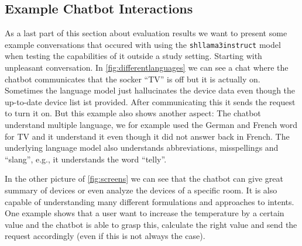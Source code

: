 \subsection{Example Chatbot Interactions}
As a last part of this section about evaluation results we want to present some example conversations that occured with using the \texttt{shllama3instruct} model when testing the capabilities of it outside a study setting.
Starting with unpleasant conversation. In \cref{fig:differentlanguages} we can see a chat where the chatbot communicates that the socker ``TV'' is off but it is actually on. Sometimes the language model just hallucinates the device data even though the up-to-date device list ist provided. After communicating this it sends the request to turn it on. But this example also shows another aspect: The chatbot understand multiple language, we for example used the German and French word for TV and it understand it even though it did not answer back in French.
The underlying language model also understands abbreviations, misspellings and ``slang'', e.g., it understands the word ``telly''.

In the other picture of \cref{fig:screens} we can see that the chatbot can give great summary of devices or even analyze the devices of a specific room. It is also capable of understanding many different formulations and approaches to intents. One example shows that a user want to increase the temperature by a certain value and the chatbot is able to grasp this, calculate the right value and send the request accordingly (even if this is not always the case).

